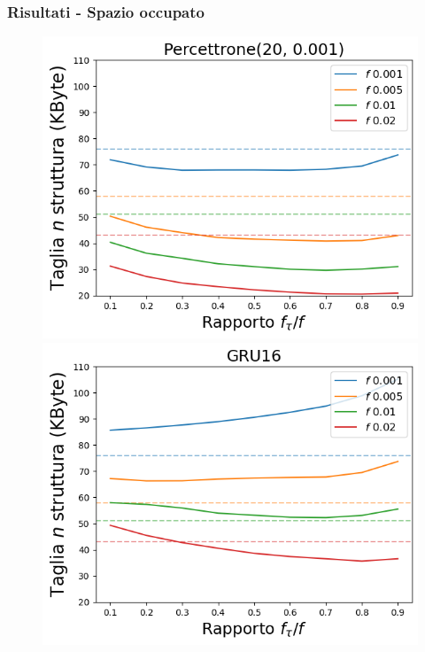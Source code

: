 \documentclass{beamer}
\begin{document}
\begin{frame}
    \frametitle{Risultati - Spazio occupato}
    \begin{figure}[htbp]
        \centering

        \begin{minipage}{0.25\textwidth}
        \includegraphics[width=\textwidth]{immagini/7/LBF/Percettrone(20, 0.001)_Taglia.png}
        \end{minipage}%
        \hfill
        \begin{minipage}{0.25\textwidth}
        \centering
        \includegraphics[width=\textwidth]{immagini/7/LBF/GRU16_Taglia.png}

\end{minipage}
\end{figure}
\end{frame}
\end{document}
